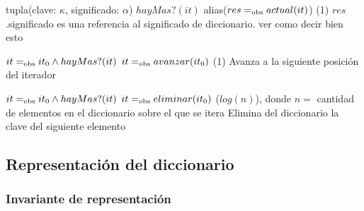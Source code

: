 {   }
{tupla(clave: $\kappa$, significado: $\alpha$)}
{$hayMas?(it)$}
{alias($res =_{\mathrm{obs}} actual(it)$)}
{\bigo(1)}
{$res$.significado es una referencia al significado de diccionario.
    \cuidado ver como decir bien esto}
{}

{   }
{}
{$it =_{\mathrm{obs}} it_0 \land hayMas?(it)$}
{$it =_{\mathrm{obs}} avanzar(it_0)$}
{\bigo(1)}
{}
{Avanza a la siguiente posición del iterador}

{   }
{}
{$it =_{\mathrm{obs}} it_0 \land hayMas?(it)$}
{$it =_{\mathrm{obs}} eliminar(it_0)$}
{\bigo($log(n)$), donde $n = $ cantidad de elementos en el 
    diccionario sobre el que se itera \cuidado}
{}
{Elimina del diccionario la clave del siguiente elemento}




\subsection{Representación del diccionario}



\subsubsection{Invariante de representación}

